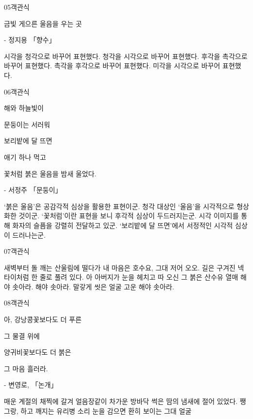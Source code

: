 \documentclass[fs9,seriesRus]{korfarm-base}
\begin{document}
\begin{kfQBlock}{05}{객관식}
\begin{kfEvidence}금빛 게으른 울음을 우는 곳

- 정지용 「향수」\end{kfEvidence}
\begin{kfChoices}
\kfChoice 시각을 청각으로 바꾸어 표현했다.
\kfChoice 청각을 시각으로 바꾸어 표현했다.
\kfChoice 후각을 촉각으로 바꾸어 표현했다.
\kfChoice 촉각을 후각으로 바꾸어 표현했다.
\kfChoice 미각을 시각으로 바꾸어 표현했다.
\end{kfChoices}
\end{kfQBlock}
\begin{kfQBlock}{06}{객관식}
\begin{kfEvidence}해와 하늘빛이

문둥이는 서러워

보리밭에 달 뜨면

애기 하나 먹고

꽃처럼 붉은 울음을 밤새 울었다.

- 서정주 「문둥이」\end{kfEvidence}
\begin{kfChoices}
\kfChoice ‘붉은 울음’은 공감각적 심상을 활용한 표현이군.
\kfChoice 청각 대상인 ‘울음’을 시각적으로 형상화한 것이군.
\kfChoice ‘꽃처럼’이란 표현을 보니 후각적 심상이 두드러지는군.
\kfChoice 시각 이미지를 통해 화자의 슬픔을 강렬히 전달하고 있군.
\kfChoice ‘보리밭에 달 뜨면’에서 서정적인 시각적 심상이 드러나는군.
\end{kfChoices}
\end{kfQBlock}
\begin{kfQBlock}{07}{객관식}
\begin{kfChoices}
\kfChoice 새벽부터 돌 깨는 산울림에 떨다가
\kfChoice 내 마음은 호수요,  그대 저어 오오.
\kfChoice 길은 구겨진 넥타이처럼 한 줄로 풀려 있다.
\kfChoice 아 아버지가 눈을 헤치고 따 오신 그 붉은 산수유 열매
\kfChoice 해야 솟아라. 해야 솟아라. 말갛게 씻은 얼굴 고운 해야 솟아라.
\end{kfChoices}
\end{kfQBlock}
\begin{kfQBlock}{08}{객관식}
\begin{kfEvidence}아, 강낭콩꽃보다도 더 푸른

그 물결 위에

양귀비꽃보다도 더 붉은

그 마음 흘러라.

- 변영로, 「논개」\end{kfEvidence}
\begin{kfChoices}
\kfChoice 매운 계절의 채찍에 갈겨
\kfChoice 얼음장같이 차가운 방바닥
\kfChoice 썩은 땀의 냄새에 절어 있었다.
\kfChoice 쨍그랑, 하고 깨지는 유리병 소리
\kfChoice 눈을 감으면 환히 보이는 그대 얼굴
\end{kfChoices}
\end{kfQBlock}
\end{document}
